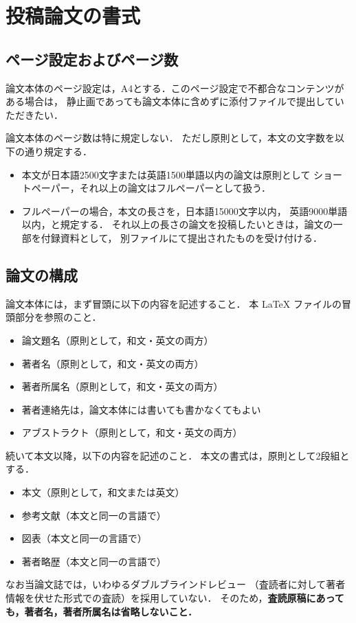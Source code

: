 \section{投稿論文の書式}

\subsection{ページ設定およびページ数}

論文本体のページ設定は，A4とする．このページ設定で不都合なコンテンツがある場合は，
静止画であっても論文本体に含めずに添付ファイルで提出していただきたい．

論文本体のページ数は特に規定しない．
ただし原則として，本文の文字数を以下の通り規定する．
\begin{itemize}
\item 本文が日本語2500文字または英語1500単語以内の論文は原則として
	ショートペーパー，それ以上の論文はフルペーパーとして扱う．
\item フルペーパーの場合，本文の長さを，日本語15000文字以内，
	英語9000単語以内，と規定する．
	それ以上の長さの論文を投稿したいときは，論文の一部を付録資料として，
	別ファイルにて提出されたものを受け付ける．
\end{itemize}

\subsection{論文の構成}

論文本体には，まず冒頭に以下の内容を記述すること．
本 LaTeX ファイルの冒頭部分を参照のこと．

\begin{itemize}
\item 論文題名（原則として，和文・英文の両方）
\item 著者名（原則として，和文・英文の両方）
\item 著者所属名（原則として，和文・英文の両方）
\item 著者連絡先は，論文本体には書いても書かなくてもよい
\item アブストラクト（原則として，和文・英文の両方）
\end{itemize}
続いて本文以降，以下の内容を記述のこと．
本文の書式は，原則として2段組とする．
\begin{itemize}
\item 本文（原則として，和文または英文）
\item 参考文献（本文と同一の言語で）
\item 図表（本文と同一の言語で）
\item 著者略歴（本文と同一の言語で）
\end{itemize}

なお当論文誌では，いわゆるダブルブラインドレビュー
（査読者に対して著者情報を伏せた形式での査読）を採用していない．
そのため，\textbf{査読原稿にあっても，著者名，著者所属名は省略しないこと．}



